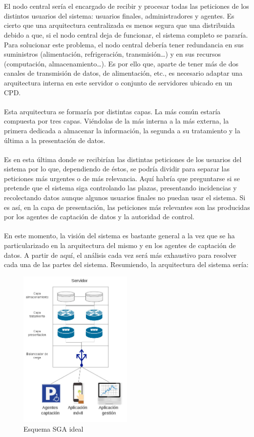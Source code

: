 \\\\
El nodo central sería el encargado de recibir y procesar todas las peticiones de los distintos usuarios del sistema: usuarios finales, administradores y agentes. Es cierto que una arquitectura centralizada es menos segura que una distribuida debido a que, si el nodo central deja de funcionar, el sistema completo se pararía. Para solucionar este problema, el nodo central debería tener redundancia en sus suministros (alimentación, refrigeración, transmisión…) y en sus recursos (computación, almacenamiento…). Es por ello que, aparte de tener más de dos canales de transmisión de datos, de alimentación, etc., es necesario adaptar una arquitectura interna en este servidor o conjunto de servidores ubicado en un CPD.
\\\\
Esta arquitectura se formaría por distintas capas. La más común estaría compuesta por tres capas. Viéndolas de la más interna a la más externa, la primera dedicada a almacenar la información, la segunda a su tratamiento y la última a la presentación de datos. 
\\\\
Es en esta última donde se recibirían las distintas peticiones de los usuarios del sistema por lo que, dependiendo de éstos, se podría dividir para separar las peticiones más urgentes o de más relevancia. Aquí habría que preguntarse si se pretende que el sistema siga controlando las plazas, presentando incidencias y recolectando datos aunque algunos usuarios finales no puedan usar el sistema. Si es así, en la capa de presentación, las peticiones más relevantes son las producidas por los agentes de captación de datos y la autoridad de control.
\\\\
En este momento, la visión del sistema es bastante general a la vez que se ha particularizado en la arquitectura del mismo y en los agentes de captación de datos. A partir de aquí, el análisis cada vez será más exhaustivo para resolver cada una de las partes del sistema.
\newpage
Resumiendo, la arquitectura del sistema sería:
\begin{figure}[H]
	\centering
	\includegraphics[width=0.5\textwidth]{imagenes/esquema_sistema.jpg}
	\caption{Esquema SGA ideal}
	\label{esquema_sga_ideal}
\end{figure}
